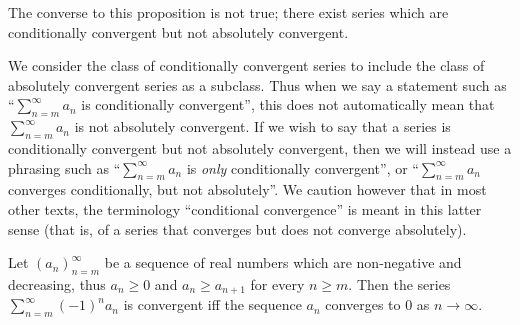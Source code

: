 \begin{rmk}\label{i:7.2.10}
  The converse to this proposition is not true;
  there exist series which are conditionally convergent but not absolutely convergent.
\end{rmk}

\begin{rmk}\label{i:7.2.11}
  We consider the class of conditionally convergent series to include the class of absolutely convergent series as a subclass.
  Thus when we say a statement such as ``\(\sum_{n = m}^\infty a_n\) is conditionally convergent'', this does not automatically mean that \(\sum_{n = m}^\infty a_n\) is not absolutely convergent.
  If we wish to say that a series is conditionally convergent but not absolutely convergent, then we will instead use a phrasing such as ``\(\sum_{n = m}^\infty a_n\) is \emph{only} conditionally convergent'', or ``\(\sum_{n = m}^\infty a_n\) converges conditionally, but not absolutely''.
  We caution however that in most other texts, the terminology ``conditional convergence'' is meant in this latter sense
  (that is, of a series that converges but does not converge absolutely).
\end{rmk}

\begin{prop}\label{i:7.2.12}
  Let \((a_n)_{n = m}^\infty\) be a sequence of real numbers which are non-negative and decreasing, thus \(a_n \geq 0\) and \(a_n \geq a_{n + 1}\) for every \(n \geq m\).
  Then the series \(\sum_{n = m}^\infty (-1)^n a_n\) is convergent iff the sequence \(a_n\) converges to \(0\) as \(n \to \infty\).
\end{prop}

